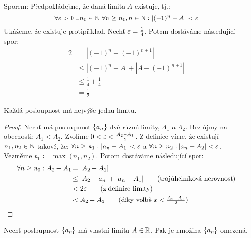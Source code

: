 \begin{remark}
\begin{itemize}
            Sporem: Předpokládejme, že
            daná limita $A$ existuje, tj.: 
            $$\forall \varepsilon > 0 \; \exists n_0 \in \mathbb{N} \; \forall n \geq n_0,n\in \mathbb{N}: 
            |(-1)^n - A| < \varepsilon$$
            Ukážeme, že existuje protipříklad. Nechť $\varepsilon = \frac{1}{4}$. Potom
            dostáváme následující spor:
            \begin{align*}
                2 &= |(-1)^n - (-1)^{n+1}| \\
                  &\leq |(-1)^n - A| + |A - (-1)^{n+1}| \tag{trojúhelníková
                    nerovnost} \\
                  &\leq \frac{1}{4} + \frac{1}{4} \tag{z definice limity pro
                $\fa n \geq n_0$} \\
                  &= \frac{1}{2}
            \end{align*}
    \end{itemize}
\end{remark}

\begin{theorem}
    \label{th:jednoznacnostlimity}
    Každá posloupnost má nejvýše jednu limitu.
\end{theorem}

\begin{proof}
    Nechť má posloupnost $\left\{a_n\right\}$ dvě různé limity, $A_1$ a $A_2$. Bez újmy
    na obecnosti: $A_1 < A_2$. Zvolíme
    $0 < \varepsilon < \frac{A_2-A_1}{2}$. Z definice víme, že existují $n_1, n_2 \in
    \mathbb{N}$ takové, že: $\forall n \geq n_1: |a_n - A_1| < \varepsilon$ a $\forall n \geq n_2: |a_n
    -A_2| < \varepsilon$. Vezměme $n_0 \coloneqq \max(n_1,n_2)$. Potom dostáváme 
    následující spor:
    \begin{align*}
        \fa n \geq n_0: A_2 - A_1 &= |A_2 - A_1| \\
                                  &\leq |A_2 - a_n| + |a_n - A_1| 
                                     \tag{trojúhelníková nerovnost}\\
                                 &< 2\e \tag{z definice limity} \\
                                 &< A_2 - A_1 \tag{díky volbě $\e < \frac{A_2 - A_1}{2}$}
    \end{align*}
\end{proof}

\begin{theorem}
    \label{th:seqomez}
    Nechť posloupnost $\left\{a_n\right\}$ má vlastní limitu $A \in \mathbb{R}$. Pak je množina
    $\left\{a_n\right\}$ omezená.
\end{theorem}

